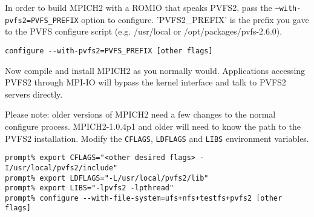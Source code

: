 \documentclass[11pt, letterpaper]{article}
\begin{document}
In order to build MPICH2 with a ROMIO that speaks PVFS2, pass the
\texttt{--with-pvfs2=PVFS\_PREFIX} option to configure.  'PVFS2\_PREFIX' is the
prefix you gave to the PVFS configure script (e.g. /usr/local or
/opt/packages/pvfs-2.6.0).  

\begin{verbatim}
configure --with-pvfs2=PVFS_PREFIX [other flags]
\end{verbatim}

Now compile and install MPICH2 as you normally would.  Applications accessing
PVFS2 through MPI-IO will bypass the kernel interface and talk to PVFS2 servers
directly.  

Please note: older versions of MPICH2 need a few changes
to the normal configure process.  MPICH2-1.0.4p1 and older will need to
know the path to the PVFS2 installation.  Modify the {\tt CFLAGS},
{\tt LDFLAGS} and {\tt LIBS} environment variables.

\begin{verbatim}
prompt% export CFLAGS="<other desired flags> -I/usr/local/pvfs2/include"
prompt% export LDFLAGS="-L/usr/local/pvfs2/lib"
prompt% export LIBS="-lpvfs2 -lpthread"
prompt% configure --with-file-system=ufs+nfs+testfs+pvfs2 [other flags]
\end{verbatim}
\end{document}
